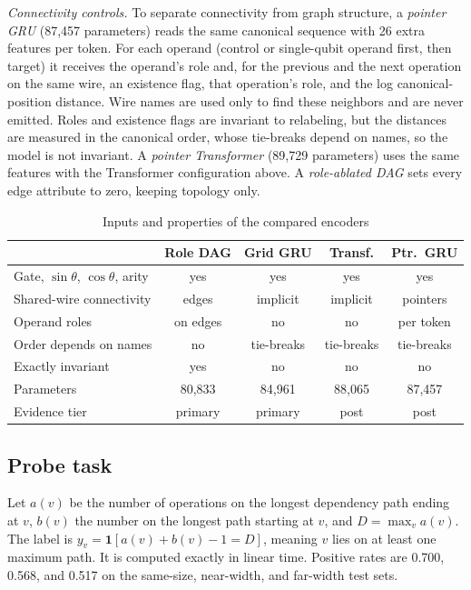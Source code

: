 \documentclass[conference,a4paper]{IEEEtran}
\newcommand{\cmark}{yes}
\newcommand{\xmark}{no}
\begin{document}
\emph{Connectivity controls.} To separate connectivity from graph structure, a \emph{pointer GRU} (87,457 parameters) reads the same canonical sequence with 26 extra features per token. For each operand (control or single-qubit operand first, then target) it receives the operand's role and, for the previous and the next operation on the same wire, an existence flag, that operation's role, and the log canonical-position distance. Wire names are used only to find these neighbors and are never emitted. Roles and existence flags are invariant to relabeling, but the distances are measured in the canonical order, whose tie-breaks depend on names, so the model is not invariant. A \emph{pointer Transformer} (89,729 parameters) uses the same features with the Transformer configuration above. A \emph{role-ablated DAG} sets every edge attribute to zero, keeping topology only.

\begin{table}[t]
\centering
\caption{Inputs and properties of the compared encoders}
\label{tab:access}
\setlength{\tabcolsep}{2pt}
\begin{tabular}{@{}lcccc@{}}
\toprule
 & Role DAG & Grid GRU & Transf. & Ptr.\ GRU \\
\midrule
Gate, $\sin\theta$, $\cos\theta$, arity & \cmark & \cmark & \cmark & \cmark \\
Shared-wire connectivity & edges & implicit & implicit & pointers \\
Operand roles & on edges & \xmark & \xmark & per token \\
Order depends on names & \xmark & tie-breaks & tie-breaks & tie-breaks \\
Exactly invariant & \cmark & \xmark & \xmark & \xmark \\
Parameters & 80,833 & 84,961 & 88,065 & 87,457 \\
Evidence tier & primary & primary & post & post \\
\bottomrule
\end{tabular}
\end{table}

\subsection{Probe task}
Let $a(v)$ be the number of operations on the longest dependency path ending at $v$, $b(v)$ the number on the longest path starting at $v$, and $D=\max_v a(v)$. The label is $y_v=\mathbf{1}[a(v)+b(v)-1=D]$, meaning $v$ lies on at least one maximum path. It is computed exactly in linear time. Positive rates are 0.700, 0.568, and 0.517 on the same-size, near-width, and far-width test sets.
\end{document}
